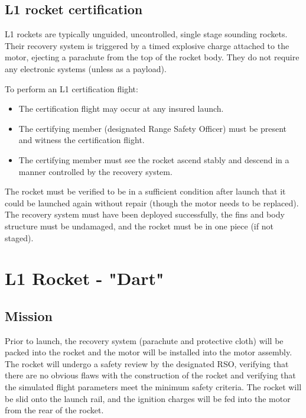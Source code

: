 \documentclass{article}
\begin{document}
    \subsection{L1 rocket certification}
    
        L1 rockets are typically unguided, uncontrolled, single stage sounding rockets.
        Their recovery system is triggered by a timed explosive charge attached to the motor, ejecting a parachute from the top of the rocket body.
        They do not require any electronic systems (unless as a payload).

        To perform an L1 certification flight:
        \begin{itemize}
            \item The certification flight may occur at any insured launch.
            \item The certifying member (designated Range Safety Officer) must be present and witness the certification flight.
            \item The certifying member must see the rocket ascend stably and descend in a manner controlled by the recovery system.
        \end{itemize}

        The rocket must be verified to be in a sufficient condition after launch that it could be launched again without repair (though the motor needs to be replaced).
        The recovery system must have been deployed successfully, the fins and body structure must be undamaged, and the rocket must be in one piece (if not staged).

\section{L1 Rocket - "Dart"}

    \subsection{Mission}
    
        Prior to launch, the recovery system (parachute and protective cloth) will be packed into the rocket and the motor will be installed into the motor assembly.
        The rocket will undergo a safety review by the designated RSO, verifying that there are no obvious flaws with the construction of the rocket and verifying that the simulated flight parameters meet the minimum safety criteria.
        The rocket will be slid onto the launch rail, and the ignition charges will be fed into the motor from the rear of the rocket.
        
\end{document}
